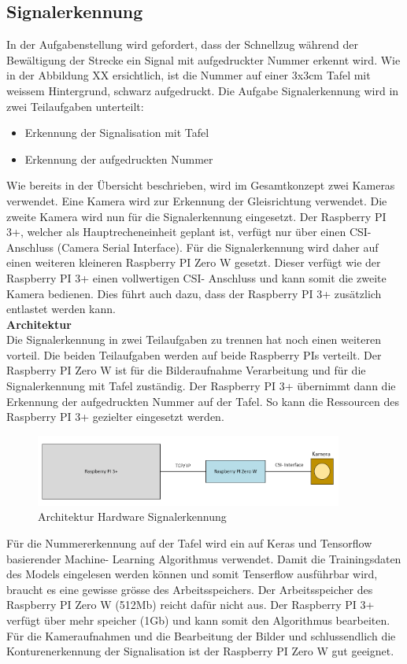 \documentclass[../../main.tex]{subfiles}
\begin{document}
\subsection{Signalerkennung}
    In der Aufgabenstellung wird gefordert, dass der Schnellzug während der Bewältigung der Strecke ein Signal mit aufgedruckter Nummer erkennt wird. Wie in der Abbildung XX ersichtlich, ist die Nummer auf einer 3x3cm Tafel mit weissem Hintergrund, schwarz aufgedruckt. Die Aufgabe Signalerkennung wird in zwei Teilaufgaben unterteilt:
    \begin{itemize}
        \item Erkennung der Signalisation mit Tafel
        \item Erkennung der aufgedruckten Nummer
    \end{itemize}
    Wie bereits in der Übersicht beschrieben, wird im Gesamtkonzept zwei Kameras verwendet. Eine Kamera wird zur Erkennung der Gleisrichtung verwendet. Die zweite Kamera wird nun für die Signalerkennung eingesetzt. Der Raspberry PI 3+, welcher als Hauptrecheneinheit geplant ist, verfügt nur über einen CSI- Anschluss (Camera Serial Interface). Für die Signalerkennung wird daher auf einen weiteren kleineren Raspberry PI Zero W gesetzt. Dieser verfügt wie der Raspberry PI 3+ einen vollwertigen CSI- Anschluss und kann somit die zweite Kamera bedienen. Dies führt auch dazu, dass der Raspberry PI 3+ zusätzlich entlastet werden kann.\\

    \textbf{Architektur}\\
    Die Signalerkennung in zwei Teilaufgaben zu trennen hat noch einen weiteren vorteil. Die beiden Teilaufgaben werden auf beide Raspberry PIs verteilt. Der Raspberry PI Zero W ist für die Bilderaufnahme Verarbeitung und für die Signalerkennung mit Tafel zuständig. Der Raspberry PI 3+ übernimmt dann die Erkennung der aufgedruckten Nummer auf der Tafel. So kann die Ressourcen des Raspberry PI 3+ gezielter eingesetzt werden.

    \begin{figure}[H] %
        \centering
        \includegraphics[width=0.9\textwidth]{Architektur.png}
        \caption{Architektur Hardware Signalerkennung}
        \label{fig:architektur_hardware_signalerkennung}
    \end{figure}

    Für die Nummererkennung auf der Tafel wird ein auf Keras und Tensorflow basierender Machine- Learning Algorithmus verwendet. Damit die Trainingsdaten des Models eingelesen werden können und somit Tenserflow ausführbar wird, braucht es eine gewisse grösse des Arbeitsspeichers. Der Arbeitsspeicher des Raspberry PI Zero W (512Mb) reicht dafür nicht aus. Der Raspberry PI 3+ verfügt über mehr speicher (1Gb) und kann somit den Algorithmus bearbeiten. Für die Kameraufnahmen und die Bearbeitung der Bilder und schlussendlich die Konturenerkennung der Signalisation ist der Raspberry PI Zero W gut geeignet. \cite{raspberrypi3A+}
\end{document}
